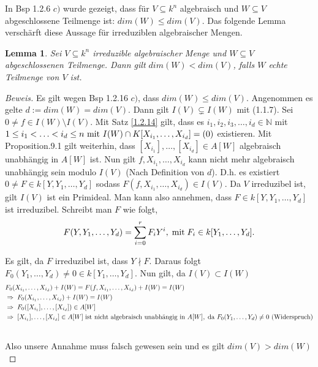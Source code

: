 \documentclass{article}
\newtheorem{lemma}[satz]{Lemma}
\newcommand*{\indx}[2]{{#1}_{#2}}
\newcommand*{\potx}[2]{{#1}^{#2}}
\newcommand*{\dkette}[2]{${#1}_1,{#1}_2,{#1}_3,\ldots,{#1}_{#2} \in \mathbb{N}$}
\begin{document}
In Bsp 1.2.6 $c)$ wurde gezeigt, dass für $V\subseteq k^n$ algebraisch und $W\subseteq V$ abgeschlossene Teilmenge ist: $dim(W)\leq dim(V)$. Das folgende Lemma verschärft diese Aussage für irreduziblen algebraischer Mengen.

\begin{lemma}
	Sei $V\subseteq k^n$ irreduzible algebraischer Menge und $W\subseteq V$ abgeschlossenen Teilmenge. Dann gilt $dim(W)<dim(V)$, falls $W$ echte Teilmenge von $V$ ist.
\end{lemma} 

\begin{proof}[Beweis]
	Es gilt wegen Bsp 1.2.16 $c)$, dass $dim(W)\leq dim(V)$. Angenommen es gelte $d:=dim(W)=dim(V)$. Dann gilt $I(V)\subsetneq I(W)$ mit (1.1.7). Sei $0\neq f\in I(W)\setminus I(V)$. Mit Satz \ref{1.2.14} gilt, dass es \dkette{i}{d} mit $ 1\leq\indx{i}{1}<\ldots<\indx{i}{d}\leq n \textnormal{ mit } I(W)\cap K[\indx{X}{\indx{i}{1}},\ldots,\indx{X}{\indx{i}{d}}]=(0)$ existieren. Mit Proposition.9.1 gilt weiterhin, dass $[\indx{X}{\indx{i}{1}}],\ldots,[\indx{X}{\indx{i}{d}}] \in A[W]$ algebraisch unabhängig in $A[W]$ ist. Nun gilt $f,\indx{X}{\indx{i}{1}},\ldots,\indx{X}{\indx{i}{d}}$ kann nicht mehr algebraisch unabhängig sein  modulo $I(V)$ (Nach Definition von $d$).
	D.h. es existiert $0\neq F\in k[Y,\indx{Y}{1},\ldots,\indx{Y}{d}]$ sodass $F(f,\indx{X}{\indx{i}{1}},\ldots,\indx{X}{\indx{i}{d}})\in I(V)$. Da $V$ irreduzibel ist, gilt $I(V)$ ist ein Primideal. Man kann also annehmen, dass $F\in k[Y,\indx{Y}{1},\ldots,\indx{Y}{d}]$ ist irreduzibel.
Schreibt man $F$ wie folgt, 
	\begin{displaymath}
	F(Y,\indx{Y}{1},\ldots,\indx{Y}{d})=\sum_{i=0}^{r}\indx{F}{i}\potx{Y}{i},\; \textnormal{mit}\;  \indx{F}{i}\in k[\indx{Y}{1},\ldots,\indx{Y}{d}].
	\end{displaymath}
	
	Es gilt, da $F$ irreduzibel ist, dass $Y\nmid F$. Daraus folgt $\indx{F}{0}(\indx{Y}{1},\ldots,\indx{Y}{d})\neq0 \in k[\indx{Y}{1},\ldots,\indx{Y}{d}]$. Nun gilt, da $I(V)\subset I(W)$ 
	\begin{align*}
&\indx{F}{0}(\indx{X}{\indx{i}{1}},\ldots,\indx{X}{\indx{i}{d}})+I(W)=F(f,\indx{X}{\indx{i}{1}},\ldots,\indx{X}{\indx{i}{d}})+I(W)=I(W)\\&
\Rightarrow \; \indx{F}{0}(\indx{X}{\indx{i}{1}},\ldots,\indx{X}{\indx{i}{d}})+I(W)=I(W)\\&
\Rightarrow \; \indx{F}{0}([\indx{X}{\indx{i}{1}}],\ldots,[\indx{X}{\indx{i}{d}}]) \in A[W]\\&
\Rightarrow\; [\indx{X}{\indx{i}{1}}],\ldots,[\indx{X}{\indx{i}{d}}]\in A[W]\; \textnormal{ist nicht algebraisch unabhängig in }A[W],\;\textnormal{da $\indx{F}{0}(\indx{Y}{1},\ldots,\indx{Y}{d})\neq0$ (Widerspruch)}\\& 
	\end{align*}
	
	Also unsere Annahme muss falsch gewesen sein und es gilt $dim(V)>dim(W)$
\end{proof}
\end{document}

